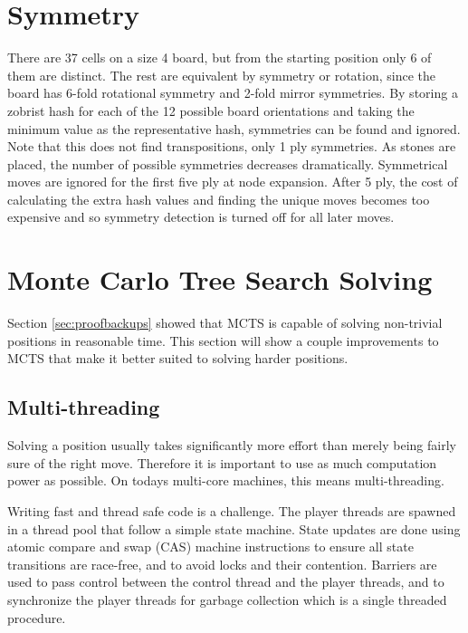 

\section{Symmetry}


There are 37 cells on a size 4 board, but from the starting position only 6 of them are distinct. The rest are equivalent by symmetry or rotation, since the board has 6-fold rotational symmetry and 2-fold mirror symmetries. By storing a zobrist hash for each of the 12 possible board orientations and taking the minimum value as the representative hash, symmetries can be found and ignored. Note that this does not find transpositions, only 1 ply symmetries. As stones are placed, the number of possible symmetries decreases dramatically. Symmetrical moves are ignored for the first five ply at node expansion. After 5 ply, the cost of calculating the extra hash values and finding the unique moves becomes too expensive and so symmetry detection is turned off for all later moves.


\section{Monte Carlo Tree Search Solving}

Section \ref{sec:proofbackups} showed that MCTS is capable of solving non-trivial positions in reasonable time. This section will show a couple improvements to MCTS that make it better suited to solving harder positions.

\subsection{Multi-threading}

Solving a position usually takes significantly more effort than merely being fairly sure of the right move. Therefore it is important to use as much computation power as possible. On todays multi-core machines, this means multi-threading.

Writing fast and thread safe code is a challenge. The player threads are spawned in a thread pool that follow a simple state machine. State updates are done using atomic compare and swap (CAS) machine instructions to ensure all state transitions are race-free, and to avoid locks and their contention. Barriers are used to pass control between the control thread and the player threads, and to synchronize the player threads for garbage collection which is a single threaded procedure.

